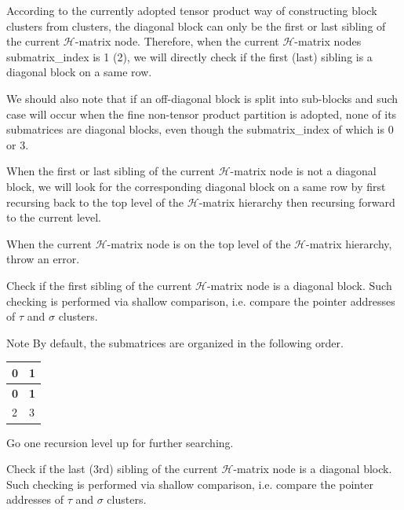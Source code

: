 According to the currently adopted tensor product way of constructing block clusters from clusters, the diagonal block can only be the first or last sibling of the current $\mathcal{H}$-\/matrix node. Therefore, when the current $\mathcal{H}$-\/matrix node\textquotesingle{}s {\ttfamily submatrix\+\_\+index} is 1 (2), we will directly check if the first (last) sibling is a diagonal block on a same row.

We should also note that if an off-\/diagonal block is split into sub-\/blocks and such case will occur when the fine non-\/tensor product partition is adopted, none of its submatrices are diagonal blocks, even though the {\ttfamily submatrix\+\_\+index} of which is 0 or 3.

When the first or last sibling of the current $\mathcal{H}$-\/matrix node is not a diagonal block, we will look for the corresponding diagonal block on a same row by first recursing back to the top level of the $\mathcal{H}$-\/matrix hierarchy then recursing forward to the current level.

When the current $\mathcal{H}$-\/matrix node is on the top level of the $\mathcal{H}$-\/matrix hierarchy, throw an error.

Check if the first sibling of the current $\mathcal{H}$-\/matrix node is a diagonal block. Such checking is performed via shallow comparison, i.\+e. compare the pointer addresses of $\tau$ and $\sigma$ clusters.


\begin{DoxyDescription}
\item[Note ]By default, the submatrices are organized in the following order. {\ttfamily  \tabulinesep=1mm
\begin{longtabu} spread 0pt [c]{*{2}{|X[-1]}|}
\hline
\rowcolor{\tableheadbgcolor}\textbf{ 0 }&\textbf{ 1  }\\
\endfirsthead
\hline
\endfoot
\hline
\rowcolor{\tableheadbgcolor}\textbf{ 0 }&\textbf{ 1  }\\
 &3 \\
\end{longtabu}
} 
\end{DoxyDescription}

Go one recursion level up for further searching.

Check if the last (3rd) sibling of the current $\mathcal{H}$-\/matrix node is a diagonal block. Such checking is performed via shallow comparison, i.\+e. compare the pointer addresses of $\tau$ and $\sigma$ clusters.

